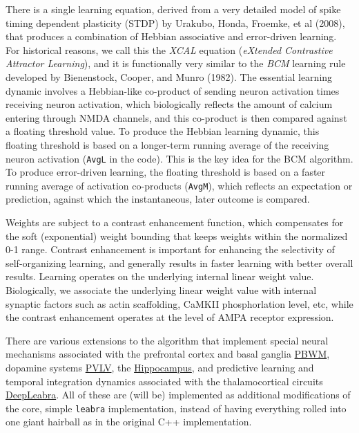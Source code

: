 There is a single learning equation, derived from a very detailed model
of spike timing dependent plasticity (STDP) by Urakubo, Honda, Froemke,
et al (2008), that produces a combination of Hebbian associative and
error-driven learning. For historical reasons, we call this the
\emph{XCAL} equation (\emph{eXtended Contrastive Attractor Learning}),
and it is functionally very similar to the \emph{BCM} learning rule
developed by Bienenstock, Cooper, and Munro (1982). The essential
learning dynamic involves a Hebbian-like co-product of sending neuron
activation times receiving neuron activation, which biologically
reflects the amount of calcium entering through NMDA channels, and this
co-product is then compared against a floating threshold value. To
produce the Hebbian learning dynamic, this floating threshold is based
on a longer-term running average of the receiving neuron activation
(\texttt{AvgL} in the code). This is the key idea for the BCM algorithm.
To produce error-driven learning, the floating threshold is based on a
faster running average of activation co-products (\texttt{AvgM}), which
reflects an expectation or prediction, against which the instantaneous,
later outcome is compared.

Weights are subject to a contrast enhancement function, which
compensates for the soft (exponential) weight bounding that keeps
weights within the normalized 0-1 range. Contrast enhancement is
important for enhancing the selectivity of self-organizing learning, and
generally results in faster learning with better overall results.
Learning operates on the underlying internal linear weight value.
Biologically, we associate the underlying linear weight value with
internal synaptic factors such as actin scaffolding, CaMKII
phosphorlation level, etc, while the contrast enhancement operates at
the level of AMPA receptor expression.

There are various extensions to the algorithm that implement special
neural mechanisms associated with the prefrontal cortex and basal
ganglia \protect\hyperlink{pbwm}{PBWM}, dopamine systems
\protect\hyperlink{pvlv}{PVLV}, the
\protect\hyperlink{hippocampus}{Hippocampus}, and predictive learning
and temporal integration dynamics associated with the thalamocortical
circuits \protect\hyperlink{deepleabra}{DeepLeabra}. All of these are
(will be) implemented as additional modifications of the core, simple
\texttt{leabra} implementation, instead of having everything rolled into
one giant hairball as in the original C++ implementation.

